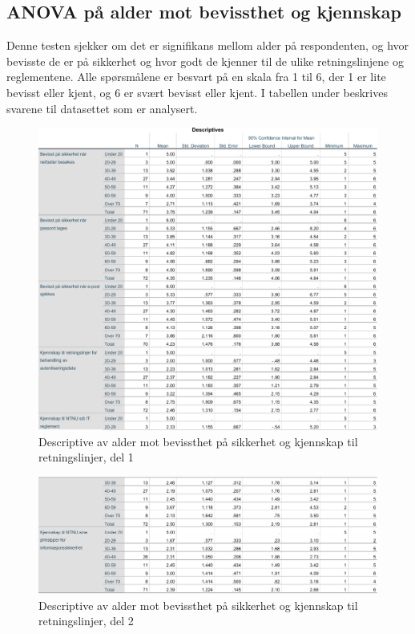 \subsection{ANOVA på alder mot bevissthet og kjennskap}
Denne testen sjekker om det er signifikans mellom alder på respondenten, og hvor bevisste de er på sikkerhet og hvor godt de kjenner til de ulike retningslinjene og reglementene. Alle spørsmålene er besvart på en skala fra 1 til 6, der 1 er lite bevisst eller kjent, og 6 er svært bevisst eller kjent. I tabellen under beskrives svarene til datasettet som er analysert. 
\begin{figure}[H]
    \centering
    \includegraphics[scale=0.7]{case_2/bilder/spss/anova_ttest/alder_bevissthetogkjennskap_descriptive_1.pdf}
    \caption[alder-bevissthetogkjennskap-descriptive-1]{Descriptive av alder mot bevissthet på sikkerhet og kjennskap til retningslinjer, del 1}
    \label{fig:alder-bevissthetogkjennskap-descriptive-1}
\end{figure}

\begin{figure}[H]
    \centering
    \includegraphics[scale=0.7]{case_2/bilder/spss/anova_ttest/alder_bevissthetogkjennskap_descriptive_2.pdf}
    \caption[alder-bevissthetogkjennskap-descriptive-2]{Descriptive av alder mot bevissthet på sikkerhet og kjennskap til retningslinjer, del 2}
    \label{fig:alder-bevissthetogkjennskap-descriptive-2}
\end{figure}


